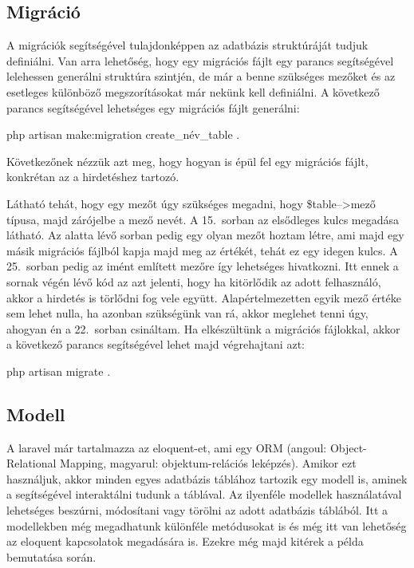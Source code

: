 \documentclass[]{thesis-ekf}
\theoremstyle{definition}
\theoremstyle{remark}
\begin{document}
	\subsection{Migráció}
		A migrációk segítségével tulajdonképpen az adatbázis struktúráját tudjuk definiálni. Van arra lehetőség, hogy egy migrációs fájlt egy parancs segítségével lelehessen generálni struktúra szintjén, de már a benne szükséges mezőket és az esetleges különböző megszorításokat már nekünk kell definiálni. A következő parancs segítségével lehetséges egy migrációs fájlt generálni:
		\begin{center} 
			php artisan make:migration create\_név\_table .
		\end{center}
		Következőnek nézzük azt meg, hogy hogyan is épül fel egy migrációs fájlt, konkrétan az a hirdetéshez tartozó.
	
		
		
		Látható tehát, hogy egy mezőt úgy szükséges megadni, hogy \$table-->mező típusa, majd zárójelbe a mező nevét.
		A 15.~sorban az elsődleges kulcs megadása látható. Az alatta lévő sorban pedig egy olyan mezőt hoztam létre, ami majd egy másik migrációs fájlból kapja majd meg az értékét, tehát ez egy idegen kulcs. A 25.~sorban pedig az imént említett mezőre így lehetséges hivatkozni. Itt ennek a sornak végén lévő kód az azt jelenti, hogy ha kitörlődik az adott felhasználó, akkor a hirdetés is törlődni fog vele együtt. Alapértelmezetten egyik mező értéke sem lehet nulla, ha azonban szükségünk van rá, akkor meglehet tenni úgy, ahogyan én a 22.~sorban csináltam. Ha elkészültünk a migrációs fájlokkal, akkor a következő parancs segítségével lehet majd végrehajtani azt:
		\begin{center}
			php artisan migrate .
		\end{center}
	\subsection{Modell}
		A laravel már tartalmazza az eloquent-et, ami egy ORM (angoul: Object-Relational Mapping, magyarul: objektum-relációs leképzés). Amikor ezt használjuk, akkor minden egyes adatbázis táblához tartozik egy modell is, aminek a segítségével interaktálni tudunk a táblával. Az ilyenféle modellek használatával lehetséges beszúrni, módosítani vagy törölni az adott adatbázis táblából. Itt a modellekben még megadhatunk különféle metódusokat is és még itt van lehetőség az eloquent kapcsolatok megadására is. Ezekre még majd kitérek a példa bemutatása során.\cite{Laravel}
		
\end{document}
